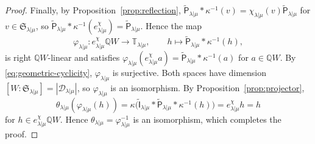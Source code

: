 \documentclass[11pt,a4paper]{amsart}
\theoremstyle{definition}
\theoremstyle{remark}
\newcommand{\Q}{\mathbb Q}
\newcommand{\bT}{\mathbb T}
\newcommand{\lm}{\lambda|\mu}
\numberwithin{equation}{section}
\begin{document}
\begin{proof}
Finally, by Proposition~\ref{prop:reflection},
$\widetilde{\mathsf P}_{\lm}*\kappa^{-1}(v)=\chi_{\lm}(v)\widetilde{\mathsf P}_{\lm}$ for $v\in\mathfrak S_{\lm}$,
so $\widetilde{\mathsf P}_{\lm}*\kappa^{-1}(e_{\lm}^\chi)=\widetilde{\mathsf P}_{\lm}$. Hence the map
$$
\varphi_{\lm}:e_{\lm}^\chi\Q W\longrightarrow\bT_{\lm},\qquad
h\longmapsto \widetilde{\mathsf P}_{\lm}*\kappa^{-1}(h),
$$
is right $\Q W$-linear and satisfies
$\varphi_{\lm}(e_{\lm}^\chi a)=\widetilde{\mathsf P}_{\lm}*\kappa^{-1}(a)$ for $a\in\Q W$. By
\eqref{eq:geometric-cyclicity}, $\varphi_{\lm}$ is surjective. Both spaces
have dimension $[W:\mathfrak S_{\lm}]=|\mathcal D_{\lm}|$, so
$\varphi_{\lm}$ is an isomorphism. By Proposition~\ref{prop:projector},
$$
\theta_{\lm}(\varphi_{\lm}(h))=\kappa\bigl(\widetilde{\mathsf I}_{\lm}*\widetilde{\mathsf P}_{\lm}*\kappa^{-1}(h)\bigr)
=e_{\lm}^\chi h=h
$$
for $h\in e_{\lm}^\chi\Q W$. Hence $\theta_{\lm}=\varphi_{\lm}^{-1}$ is an isomorphism, which completes the proof.
\end{proof}
\end{document}
